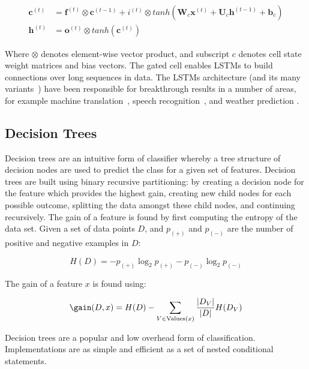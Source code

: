 \begin{align}
  \bm{c}^{(t)} &= \bm{f}^{(t)} \otimes \bm{c}^{(t-1)} + i^{(t)} \otimes tanh \left( \bm{W}_c \bm{x}^{(t)} + \bm{U}_c \bm{h}^{(t-1)} + \bm{b}_c \right) \\
  \bm{h}^{(t)} &= \bm{o}^{(t)} \otimes tanh ( \bm{c} ^{(t)} )
\end{align}

Where $\otimes$ denotes element-wise vector product, and subscript $c$ denotes cell state weight matrices and bias vectors. The gated cell enables LSTMs to build connections over long sequences in data. The LSTMs architecture (and its many variants~\cite{Greff2015}) have been responsible for breakthrough results in a number of areas, for example machine translation~\cite{Sutskever2014}, speech recognition~\cite{Graves2005}, and weather prediction \cite{Shi2015a}.


\subsection{Decision Trees}

Decision trees are an intuitive form of classifier whereby a tree structure of decision nodes are used to predict the class for a given set of features. Decision trees are built using binary recursive partitioning: by creating a decision node for the feature which provides the highest gain, creating new child nodes for each possible outcome, splitting the data amongst these child nodes, and continuing recursively. The gain of a feature is found by first computing the entropy of the data set. Given a set of data points $D$, and $p_{(+)}$ and $p_{(-)}$ are the number of positive and negative examples in $D$:

\begin{equation}
  H(D) = - p_{(+)}\log_2p_{(+)} - p_{(-)}\log_2p_{(-)}
\end{equation}

The gain of a feature $x$ is found using:

\begin{equation}
  \gain(D, x) = H(D) - \sum_{V \in \text{Values}(x)}\frac{|D_V|}{|D|}H(D_V)
\end{equation}

Decision trees are a popular and low overhead form of classification. Implementations are as simple and efficient as a set of nested conditional statements.

